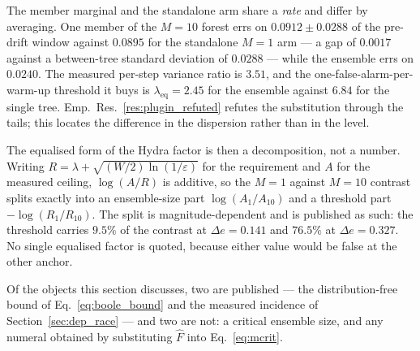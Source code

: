 The member marginal and the standalone arm share a \emph{rate} and differ by averaging. One member
of the $M=10$ forest errs on $0.0912 \pm 0.0288$ of the pre-drift window against $0.0895$ for the
standalone $M=1$ arm --- a gap of $0.0017$ against a between-tree standard deviation of $0.0288$ ---
while the ensemble errs on $0.0240$. The measured per-step variance ratio is $3.51$, and the
one-false-alarm-per-warm-up threshold it buys is $\lambda_{\mathrm{eq}} = 2.45$ for the ensemble
against $6.84$ for the single tree. Emp.~Res.~\ref{res:plugin_refuted} refutes the substitution
through the tails; this locates the difference in the dispersion rather than in the level.

The equalised form of the Hydra factor is then a decomposition, not a number. Writing
$R = \lambda + \sqrt{(W/2)\ln(1/\varepsilon)}$ for the requirement and $A$ for the measured
ceiling, $\log(A/R)$ is additive, so the $M=1$ against $M=10$ contrast splits exactly into an
ensemble-size part $\log(A_1/A_{10})$ and a threshold part $-\log(R_1/R_{10})$. The split is
magnitude-dependent and is published as such: the threshold carries $9.5\%$ of the contrast at
$\Delta e = 0.141$ and $76.5\%$ at $\Delta e = 0.327$. No single equalised factor is quoted, because
either value would be false at the other anchor.

Of the objects this section discusses, two are published --- the distribution-free
bound of Eq.~\eqref{eq:boole_bound} and the measured incidence of
Section~\ref{sec:dep_race} --- and two are not: a critical ensemble size, and any
numeral obtained by substituting $\widehat{F}$ into Eq.~\eqref{eq:mcrit}.
